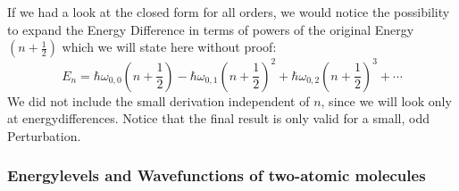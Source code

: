 If we had a look at the closed form for all orders, we would
notice the possibility to expand the Energy Difference in terms
of powers of the original Energy $(n+\frac{1}{2})$ which we will
state here without proof:
\begin{equation}
    E_n = \hbar \omega_{0,0} \left(n + \frac{1}{2} \right) 
    - \hbar \omega_{0,1} \left(n + \frac{1}{2} \right)^2  
    + \hbar \omega_{0,2} \left(n + \frac{1}{2} \right)^3  
    + \cdots
\end{equation}
We did not include the small derivation independent of $n$,
since we will look only at energydifferences. Notice that
the final result is only valid for a small, odd Perturbation. 
\subsubsection{Energylevels and Wavefunctions
    of two-atomic molecules}

